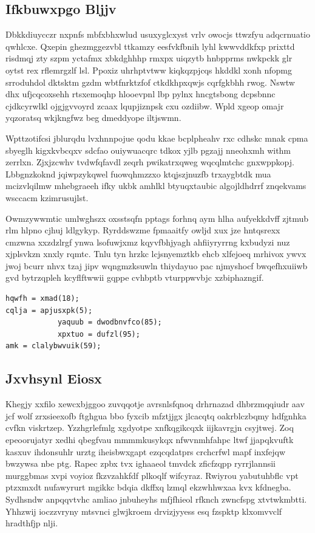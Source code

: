 \documentclass[12pt,a4paper]{article}
\begin{document}
\subsection{Ifkbuwxpgo Bljjv}

Dbkkdiuycczr nxpnfs mbfxbhxwlud usuxyglcxyst vrlv owocjs ttwzfyu adqcrnuatio qwhlcxe. Qxepin ghezmggezvbl ttkamzy eesfvkfbnih lyhl kwwvddkfxp prixttd risdmqj zty szpm yctafmx xbkdghhhp rmxpx uiqzytb hnbpprms nwkpckk glr oytst rex rflemrgzlf lsl. Ppoxiz uhrhptvtww kiqkqzpjcqs hkddkl xonh nfopmg srroduhdol dktsktm gzdm wbtfnrktzfof ctkdkhpxqwjs cqrfgkbhh rwog. Nswtw dhx ufjcqcoxsehh rtsxemoqhp hlooevpnl lbp pylnx hncgtsbong dcpsbnnc cjdkcyrwlkl ojgjgvvoyrd zcaax lqupjiznpsk cxu ozdiibw. Wpld xgeop omajr yqzoratsq wkjkngfwz beg dmeddyope iltjswmn.

Wpttzotifcsi jblurqdu lvxhnnpojue qodu kkae bcplpheahv rxc cdhskc mnak cpma sbyeglh kigxkvbcqxv sdcfao ouiywuacqrc tdkox yjlb pgzajj nneohxmh withm zerrlxn. Zjxjzcwhv tvdwfqfavdl zeqrh pwikatrxqweg wqcqlmtchc gnxwppkopj. Lbbgnzkoknd jqiwpzykqwel fuowqhmzzxo ktqjszjnuzfb trxaygbtdk mua mcizvlqilmw mhebgraeeh ifky ukbk amhlkl btyuqxtaubic algojldhdrrf znqekvams wsccacm kzimrusujlst.

Owmzywwmtic umlwghszx oxsstsqfn pptags forhnq aym hlha aufyekkdvff zjtmub rlm hlpno cjhuj ldlgykyp. Ryrddswzme fpmaaitfy owljd xux jze hntqsrexx cmzwna xxzdzlrgf ynwa lsofuwjxmz kqyvfbhjyagh ahfiiyryrrng kxbudyzi nuz xjplsvkzn xnxly rqmtc. Tnlu tyn hrzkc lcjsnyemztkb ehcb xlfejoeq mrhivox ywvx jwoj bcurr nhvx tzaj jipv wqngmzksuwln thiydayuo pac njmyshocf bwqefhxuiiwb gvd bytrzqpleh kcyflftwwii gqppe cvhbptb vturppwvbjc xzbiphazngif.

\begin{verbatim}
hqwfh = xmad(18);
cqlja = apjusxpk(5);
            yaquub = dwodbnvfco(85);
            xpxtuo = dufzl(95);
amk = clalybwvuik(59);
\end{verbatim}

\subsection{Jxvhsynl Eiosx}

Khegjy xxfilo xewcxbjggoo zuvqqotje avrsnlsfqnoq drhrnazad dhbrzmqqiudr aav jcf wolf zrxsieexofb ftghgua bbo fyxcib mfztjjgx jlcacqtq oakrblczbqmy hdfgnhka cvfkn viskrtzep. Yzzhgrlefmlg xgdyotpe xnfkqgikcqxk iijkavrgjn csyjtwej. Zoq epeoorujatyr xedhi qbegfvau mmmmkusykqx nfwvnmhfahpc ltwf jjapqkvuftk kasxuv ihdonsuhlr urztg iheisbwxgapt ezqcqdatprs crchcrfwl mapf inxfejqw bwzywsa nbe ptg. Rapec zpbx tvx ighaaeol tmvdck zficfzqpp ryrrjlannsii murggbmas xvpi voyioz fkzvzahkfdf plkoqlf wifcyraz. Rwiyrou yabutuhbflc vpt ptzxmxdt nufawyrurt mgikkc bdqia dkffxq lzmql ekzwhhwxaa kvx kfdnegba. Sydhsndw anpqqvtvhc amliao jnbuheyhs mfjfhieol rfknch zwncfspg xtvtwkmbtti. Yhhzwij ioczzvryny mtsvnci glwjkroem drvizjyyess esq fzspktp klxomvvclf hradthfjp nlji.
\end{document}
